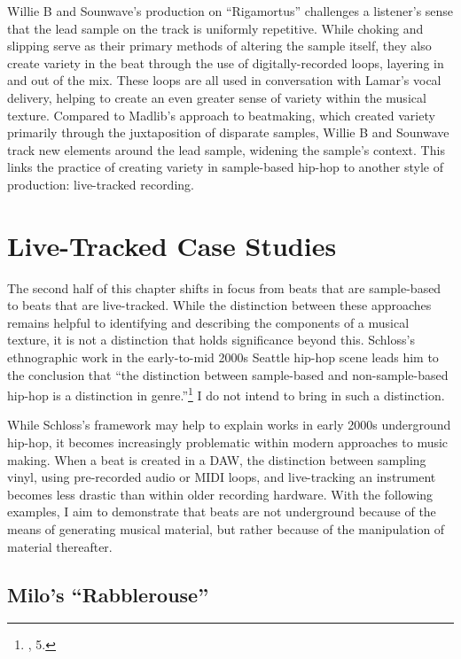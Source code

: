Willie B and Sounwave's production on ``Rigamortus'' challenges a listener's sense that 
the lead sample on the track is uniformly repetitive. While choking and slipping serve as
their primary methods of altering the sample itself, they also create variety in the beat
through the use of digitally-recorded loops, layering in and out of the mix. These loops
are all used in conversation with Lamar's vocal delivery, helping to create an even greater
sense of variety within the musical texture. Compared to Madlib's approach to beatmaking, 
which created variety primarily through the juxtaposition of disparate samples, Willie B 
and Sounwave track new elements around the lead sample, widening the sample's context. This
links the practice of creating variety in sample-based hip-hop to another style of 
production: live-tracked recording.

\section{Live-Tracked Case Studies}
The second half of this chapter shifts in focus from beats that are sample-based to beats that are
live-tracked. While the distinction between these approaches remains helpful to identifying and describing
the components of a musical texture, it is not a distinction that holds significance beyond this. 
Schloss's ethnographic work in the early-to-mid 2000s Seattle hip-hop scene leads him to the conclusion
that ``the distinction between sample-based and non-sample-based hip-hop is a distinction in
genre.''\footnote{\cite{josephgschlossMakingBeatsArt2004}, 5.} I do not intend to bring in 
such a distinction.

While Schloss's framework may help to explain works in early 2000s underground hip-hop, it becomes
increasingly problematic within modern approaches to music making. When a beat is created in a DAW, 
the distinction between sampling vinyl, using pre-recorded audio or MIDI loops, and live-tracking an
instrument becomes less drastic than within older recording hardware. With the following examples, I aim
to demonstrate that beats are not underground because of the means of generating musical material, but 
rather because of the manipulation of material thereafter.

\subsection*{\centering Milo's ``Rabblerouse''}

